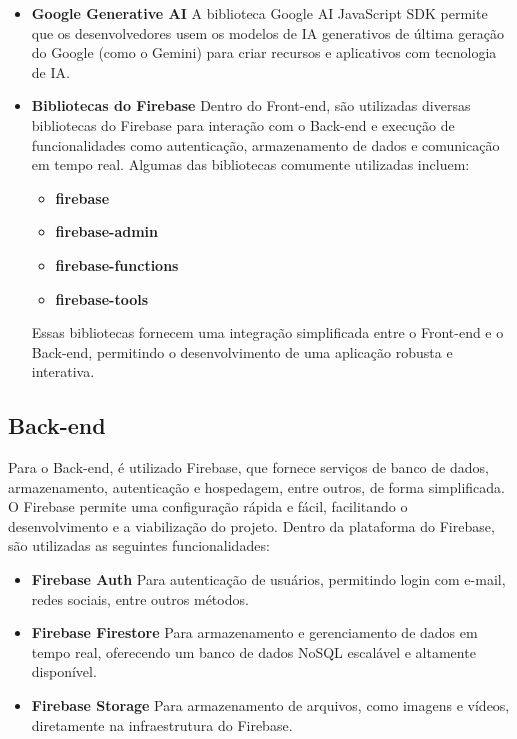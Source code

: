 \begin{itemize}
    \item \textbf{Google Generative AI} \newline
A biblioteca Google AI JavaScript SDK permite que os desenvolvedores usem os modelos de IA generativos de última geração do Google (como o Gemini) para criar recursos e aplicativos com tecnologia de IA.

    \item \textbf{Bibliotecas do Firebase} \newline
Dentro do Front-end, são utilizadas diversas bibliotecas do Firebase para interação com o Back-end e execução de funcionalidades como autenticação, armazenamento de dados e comunicação em tempo real. Algumas das bibliotecas comumente utilizadas incluem:
\begin{itemize}
    \item \textbf{firebase}
    \item \textbf{firebase-admin}
    \item \textbf{firebase-functions}
    \item \textbf{firebase-tools}
\end{itemize}

Essas bibliotecas fornecem uma integração simplificada entre o Front-end e o Back-end, permitindo o desenvolvimento de uma aplicação robusta e interativa.

\end{itemize}

\subsection{Back-end}
Para o Back-end, é utilizado Firebase, que fornece serviços de banco de dados, armazenamento, autenticação e hospedagem, entre outros, de forma simplificada. O Firebase permite uma configuração rápida e fácil, facilitando o desenvolvimento e a viabilização do projeto.
Dentro da plataforma do Firebase, são utilizadas as seguintes funcionalidades:

\begin{itemize}
\item \textbf{Firebase Auth} \newline
Para autenticação de usuários, permitindo login com e-mail, redes sociais, entre outros métodos.
\item \textbf{Firebase Firestore} \newline
Para armazenamento e gerenciamento de dados em tempo real, oferecendo um banco de dados NoSQL escalável e altamente disponível.
\item \textbf{Firebase Storage} \newline
Para armazenamento de arquivos, como imagens e vídeos, diretamente na infraestrutura do Firebase.
\end{itemize}

